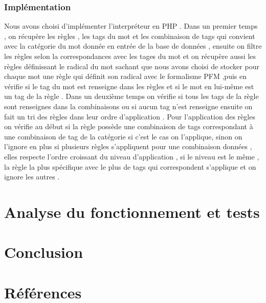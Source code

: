 \documentclass[12pt,a4paper]{article}
\begin{document}
\subsubsection{Implémentation}
Nous avons choisi d'implémenter l'interpréteur en PHP .
Dans un premier temps , on récupère les règles , les tags du mot et les combinaison de tags qui convient avec la catégorie du mot donnée en entrée de la base de données , ensuite on filtre les règles selon la correspondances avec les tages du mot et on récupère aussi les règles définissant le radical du mot sachant que nous avons choisi de stocker pour chaque mot une règle qui définit son radical avec le formalisme PFM ,puis en vérifie si le tag du mot est renseigne dans les règles et si le mot en lui-même est un tag de la règle . 
Dans un deuxième temps on vérifie si tous les tags de la règle sont renseignes dans la combinaisons ou si aucun tag n'est renseigne ensuite on fait un tri des règles dans leur ordre d'application .
Pour l'application des règles on vérifie au début si la règle possède une combinaison de tags correspondant à une combinaison de tag de la catégorie si c'est le cas on l'applique, sinon on l'ignore en plus si plusieurs règles s'appliquent pour une combinaison données , elles respecte l'ordre croissant du niveau d'application , si le niveau est le même , la règle la plus spécifique avec le plus de tags qui correspondent s'applique et on ignore les autres .


\section{Analyse du fonctionnement et tests}

\section{Conclusion}

\section{Références}


\end{document}
